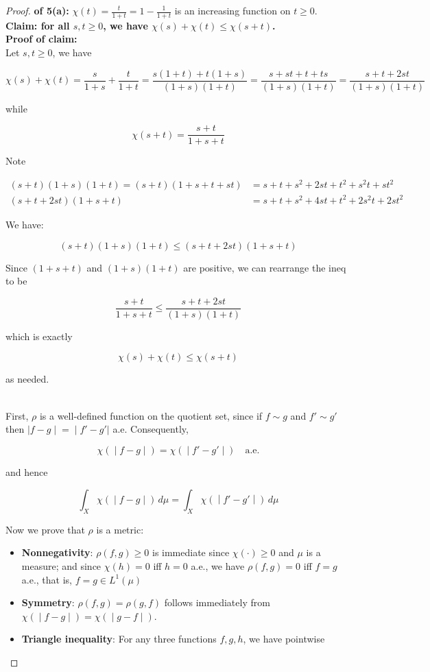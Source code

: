 \begin{proof}

\textbf{of 5(a):} \(\chi(t) = \frac{t}{1 + t} = 1 - \frac{1}{1 + t}\) is an increasing function on \(t \geq 0\).\\
\textbf{Claim: for all \(s,t \geq 0\), we have \(\chi(s) + \chi(t) \leq \chi(s + t)\).}\\
\textbf{Proof of claim:}\\
Let \(s,t \geq 0\), we have

\[\chi(s) + \chi(t) = \frac{s}{1 + s} + \frac{t}{1 + t} = \frac{s(1 + t) + t(1 + s)}{(1 + s)(1 + t)} = \frac{s + st + t + ts}{(1 + s)(1 + t)} = \frac{s + t + 2st}{(1 + s)(1 + t)}\]

while

\[\chi(s + t) = \frac{s + t}{1 + s + t}\]

Note

\[\begin{matrix}
{(s + t)(1 + s)(1 + t) = (s + t)(1 + s + t + st)} & {= s + t + s^{2} + 2st + t^{2} + s^{2}t + st^{2}} \\
{(s + t + 2st)(1 + s + t)} & {= s + t + s^{2} + 4st + t^{2} + 2s^{2}t + 2st^{2}}
\end{matrix}\]

We have:

\[(s + t)(1 + s)(1 + t) \leq (s + t + 2st)(1 + s + t)\]

Since \((1 + s + t)\) and \((1 + s)(1 + t)\) are positive, we can rearrange the ineq to be

\[\frac{s + t}{1 + s + t} \leq \frac{s + t + 2st}{(1 + s)(1 + t)}\]

which is exactly

\[\chi(s) + \chi(t) \leq \chi(s + t)\]

as needed.\\
\strut \\
First, \(\rho\) is a well-defined function on the quotient set, since if \(f \sim g\) and \(f' \sim g'\) then \(\left. |f - g \middle| = \middle| f' - g'| \right.\) a.e. Consequently,

\[\left. \chi( \middle| f - g \middle| ) = \chi( \middle| f' - g' \middle| )\quad\text{a.e.} \right.\]

and hence

\[\left. \int_{X}\chi( \middle| f - g \middle| )\, d\mu = \int_{X}\chi( \middle| f' - g' \middle| )\, d\mu \right.\]

Now we prove that \(\rho\) is a metric:

\begin{itemize}
\item
  \textbf{Nonnegativity}: \(\rho(f,g) \geq 0\) is immediate since \(\chi( \cdot ) \geq 0\) and \(\mu\) is a measure; and since \(\chi(h) = 0\) iff \(h = 0\) a.e., we have \(\rho(f,g) = 0\) iff \(f = g\) a.e., that is, \(f = g \in L^{1}(\mu)\)
\item
  \textbf{Symmetry}: \(\rho(f,g) = \rho(g,f)\) follows immediately from \(\left. \chi( \middle| f - g \middle| ) = \chi( \middle| g - f \middle| ) \right.\).
\item
  \textbf{Triangle inequality}: For any three functions \(f,g,h\), we have pointwise


\end{itemize}
\end{proof}
